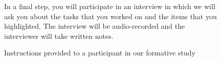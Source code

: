 \begin{figure}
\begin{mdframed}[backgroundcolor=gray!05]
\begin{footnotesize}
In a final step, you will participate in an interview in which we will ask you about the tasks that you worked on and the items that you highlighted. The interview will be audio-recorded and the interviewer will take written notes. \medskip



\end{footnotesize}
\end{mdframed}
\caption{Instructions provided to a participant in our formative study}
\end{figure}

\vfill
